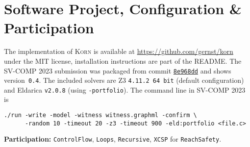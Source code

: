 \documentclass{llncs}
\newcommand{\Korn}{\textsc{Korn}\xspace}
\begin{document}
\section{Software Project, Configuration \& Participation}
\label{sec:project}

The implementation of \Korn is available at
    \url{https://github.com/gernst/korn} under the MIT license,
installation instructions are part of the README.
The SV-COMP 2023 submission was packaged from commit
\href{https://github.com/gernst/korn/commit/8e968dd9e1498d358270d1e78d473befca8e63a8}{\tt 8e968dd}
and shows version~\texttt{0.4}.
The included solvers are Z3 \texttt{4.11.2 64 bit} (default configuration) and Eldarica \texttt{v2.0.8} (using \texttt{-portfolio}).
The command line in SV-COMP 2023 is
\begin{verbatim}
./run -write -model -witness witness.graphml -confirm \
      -random 10 -timeout 20 -z3 -timeout 900 -eld:portfolio <file.c>
\end{verbatim}

\noindent \textbf{Participation:}
\texttt{ControlFlow},
\texttt{Loops},
\texttt{Recursive},
\texttt{XCSP} for  \texttt{ReachSafety}.

% 
% 
% 
% 
% 
% 
% 
% 
% 
% 
% 
\end{document}
